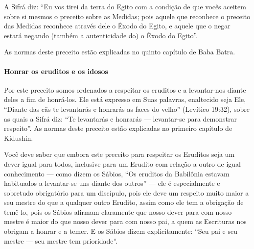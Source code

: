 A Sifrá diz: ``Eu vos tirei da terra do Egito com a condição de que
vocês aceitem sobre si mesmos o preceito sobre as Medidas; pois aquele
que reconhece o preceito das Medidas reconhece através dele o Êxodo do
Egito, e aquele que o negar estará negando (também a autenticidade do) o
Êxodo do Egito''.

As normas deste preceito estão explicadas no quinto capítulo de Baba Batra.

\paragraph{Honrar os eruditos e os idosos}

Por este preceito somos ordenados a respeitar os eruditos e a
levantar-nos diante deles a fim de honrá-los. Ele está expresso em Suas
palavras, enaltecido seja Ele, ``Diante das cãs te levantarás e
honrarás as faces do velho'' (Levítico 19:32), sobre as quais a Sifrá diz: ``Te levantarás e honrarás ---
levantar-se para demonstrar respeito''. As normas deste preceito estão
explicadas no primeiro capítulo de Kidushin.

Você deve saber que embora este preceito para respeitar os Eruditos
seja um dever igual para todos, inclusive para um Erudito com relação a
outro de igual conhecimento --- como dizem os Sábios, ``Os eruditos da
Babilônia estavam habituados a levantar-se uns diante dos outros'' ---
ele é especialmente e sobretudo obrigatório para um discípulo, pois ele
deve um respeito muito maior a seu mestre do que a qualquer outro
Erudito, assim como ele tem a obrigação de temê-lo, pois os Sábios
afirmam claramente que nosso dever para com nosso mestre é maior do que
nosso dever para com nosso pai, a quem as Escrituras nos obrigam a
honrar e a temer. E os Sábios dizem explicitamente: ``Seu pai e seu
mestre --- seu mestre tem prioridade''.

